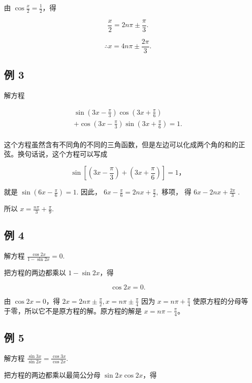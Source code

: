 由 \(\cos \frac{x}{2} = \frac{1}{2}\)，得

\[
\frac {x}{2} = 2 n \pi \pm \frac {\pi}{3}.
\]

\[
\therefore x = 4 n \pi \pm \frac {2 \pi}{3}.
\]

\subsection{例 3}

解方程

\[
\begin{array}{l} \sin \left(3 x - \frac {\pi}{3}\right) \cos \left(3 x + \frac {\pi}{6}\right) \\ + \cos \left(3 x - \frac {\pi}{3}\right) \sin \left(3 x + \frac {\pi}{6}\right) = 1. \\ \end{array}
\]

这个方程虽然含有不同角的不同的三角函数，但是左边可以化成两个角的和的正弦。换句话说，这个方程可以写成

\[
\sin \left[ \left(3 x - \frac {\pi}{3}\right) + \left(3 x + \frac {\pi}{6}\right) \right] = 1\text{，}
\]

就是 \(\sin \left(6x - \frac{\pi}{6}\right) = 1.\) 因此，
\(6x - \frac{\pi}{6} = 2nx + \frac{\pi}{2},\) 移项， 得
\(6x - 2nx + \frac{2\pi}{3}\) .

所以 \(x = \frac{n\pi}{3} +\frac{\pi}{9}.\)

\subsection{例 4}

解方程 \(\frac{\cos 2x}{1 - \sin 2x} = 0.\)

 把方程的两边都乘以 \(1 - \sin 2x\)，得

\[
\cos 2 x = 0.
\]

由 \(\cos 2x = 0\)，得
\(2x = 2n\pi \pm \frac{\pi}{2}, x = n\pi \pm \frac{\pi}{4}\) 因为
\(x = n\pi + \frac{\pi}{4}\)
使原方程的分母等于零，所以它不是原方程的解。原方程的解是
\(x = n\pi - \frac{\pi}{4}\)。

\subsection{例 5}

解方程 \(\frac{\sin 3x}{\sin 2x} = \frac{\cos 3x}{\cos 2x}\).

 把方程的两边都乘以最简公分母 \(\sin 2x\cos 2x\)，得

